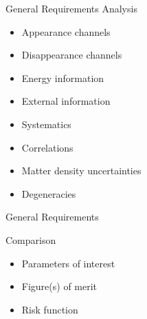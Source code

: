 \documentclass[pdf,ps2pdf,azure,slideColor,colorBG]{prosper}
\begin{document}

\begin{slide}{General Requirements}
Analysis
\begin{itemize}
\item Appearance channels
\item Disappearance channels
\item Energy information
\item External information 
\end{itemize}

\begin{itemize}
\item Systematics
\item Correlations
\item Matter density uncertainties
\item Degeneracies
\end{itemize}


\end{slide}
\begin{slide}{General Requirements}


Comparison
\begin{itemize}
\item Parameters of interest
\item Figure(s) of merit
\item Risk function
\end{itemize}


\end{slide}
\end{document}
